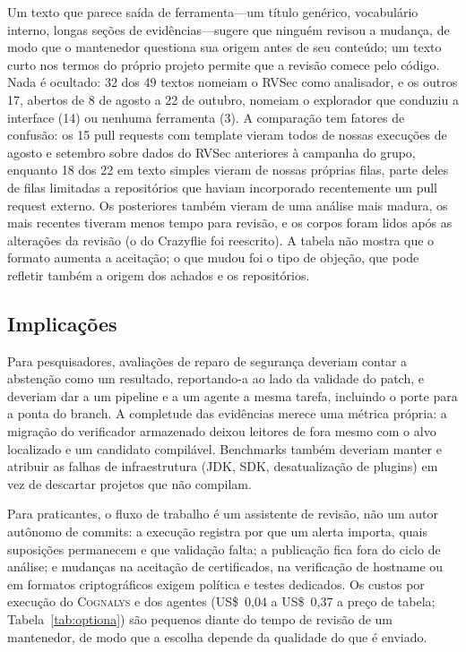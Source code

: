 \documentclass[conference]{IEEEtran}
\newcommand{\system}{\textsc{Cognalys}}
\begin{document}
Um texto que parece saída de ferramenta---um título genérico, vocabulário interno,
longas seções de evidências---sugere que ninguém revisou a mudança, de modo que o
mantenedor questiona sua origem antes de seu conteúdo; um texto curto nos
termos do próprio projeto permite que a revisão comece pelo código. Nada é ocultado: 32 dos 49
textos nomeiam o RVSec como analisador, e os outros 17, abertos de 8 de agosto a
22 de outubro, nomeiam o explorador que conduziu a interface (14) ou nenhuma
ferramenta (3).
A comparação tem fatores de confusão: os 15 pull requests com template vieram todos de
nossas execuções de agosto e setembro sobre dados do RVSec anteriores à campanha do grupo,
enquanto 18 dos 22 em texto simples vieram de nossas próprias filas, parte deles de filas
limitadas a repositórios que haviam incorporado recentemente um pull request externo. Os
posteriores também vieram de uma análise mais madura, os mais recentes tiveram menos
tempo para revisão, e os corpos foram lidos após as alterações da revisão (o do Crazyflie
foi reescrito). A tabela não mostra que o formato aumenta a aceitação; o que mudou foi o
tipo de objeção, que pode refletir também a origem dos achados e os repositórios.

\subsection{Implicações}

Para pesquisadores, avaliações de reparo de segurança deveriam contar a abstenção como um
resultado, reportando-a ao lado da validade do patch, e deveriam dar a um pipeline e a um
agente a mesma tarefa, incluindo o porte para a ponta do branch. A completude das
evidências merece uma métrica própria: a migração do verificador armazenado deixou
leitores de fora mesmo com o alvo localizado e um candidato compilável. Benchmarks também
deveriam manter e atribuir as falhas de infraestrutura (JDK, SDK, desatualização de
plugins) em vez de descartar projetos que não compilam.

Para praticantes, o fluxo de trabalho é um assistente de revisão, não um autor
autônomo de commits: a execução registra por que um alerta importa, quais suposições
permanecem e que validação falta; a publicação fica fora do ciclo de análise; e mudanças
na aceitação de certificados, na verificação de hostname ou em formatos criptográficos
exigem política e testes dedicados. Os custos por execução do \system{} e dos
agentes (US\$~0,04 a US\$~0,37 a preço de tabela; Tabela~\ref{tab:optiona}) são
pequenos diante do tempo de revisão de um mantenedor, de modo que a escolha depende
da qualidade do que é enviado.
\end{document}
